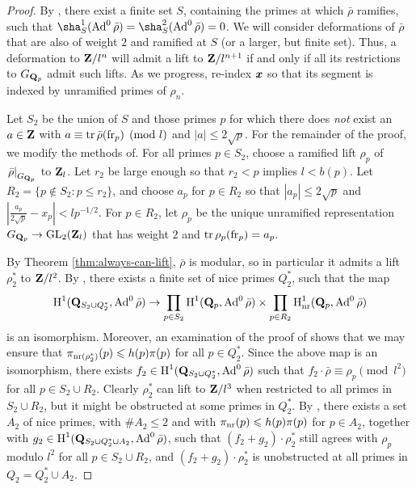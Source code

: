 \begin{proof}
By \cite[Lem.~6]{khare-larsen-ramakrishna-2005}, there exist a finite set 
$S$, containing the primes at which $\bar\rho$ ramifies, such that 
$\sha_S^1(\Ad^0\bar\rho) = \sha_S^2(\Ad^0\bar\rho) = 0$. We will 
consider deformations of $\bar\rho$ that are also of weight $2$ and ramified at 
$S$ (or a larger, but finite set). Thus, a deformation to $\mathbf{Z}/l^n$ will 
admit a lift to $\mathbf{Z}/l^{n+1}$ if and only if all its restrictions to 
$G_{\mathbf{Q}_p}$ admit such lifts. As we progress, re-index ${\boldsymbol x}$ so that its 
segment is indexed by unramified primes of $\rho_n$. 

Let $S_2$ be the union of $S$ and those primes $p$ for which there does 
\emph{not} exist an $a\in \mathbf{Z}$ with $a\equiv \operatorname{tr}\bar\rho(\mathrm{fr}_p)\pmod{l}$ and 
$|a|\leqslant 2\sqrt p$. For the remainder of the proof, we modify the methods 
of\cite{khare-larsen-ramakrishna-2005,pande-2011}. For all primes $p\in S_2$, 
choose a ramified lift $\rho_p$ of $\left.\bar\rho\right|_{G_{\mathbf{Q}_p}}$ to 
$\mathbf{Z}_l$. Let $r_2$ be large enough so that $r_2 < p$ implies $l < b(p)$. Let 
$R_2 = \{p\notin S_2 : p \leqslant r_2\}$, and choose $a_p$ for $p\in R_2$ so 
that $|a_p| \leqslant 2\sqrt p$ and 
$\left|\frac{a_p}{2\sqrt p} - x_p\right| < l p^{-1/2}$. For $p\in R_2$, let 
$\rho_p$ be the unique unramified representation $G_{\mathbf{Q}_p} \to \operatorname{GL}_2(\mathbf{Z}_l)$ 
that has weight $2$ and $\operatorname{tr}\rho_p(\mathrm{fr}_p) = a_p$. 

By Theorem \ref{thm:always-can-lift}, $\bar\rho$ is modular, so in particular 
it admits a lift $\rho_2^\ast$ to $\mathbf{Z}/l^2$. By 
\cite[Lem.~8]{khare-larsen-ramakrishna-2005}, there exists a finite set of 
nice primes $Q_2^\ast$, such that the map 
\[
	\operatorname{H}^1(\mathbf{Q}_{S_2\cup Q_2^\ast},\operatorname{Ad}^0\bar\rho) \to \prod_{p\in S_2} \operatorname{H}^1(\mathbf{Q}_p,\operatorname{Ad}^0\bar\rho) \times \prod_{p\in R_2} \operatorname{H}_{\mathrm{nr}}^1(\mathbf{Q}_p,\operatorname{Ad}^0\bar\rho) 
\]
is an isomorphism. Moreover, an examination of the proof of 
\cite[Fact 5]{khare-larsen-ramakrishna-2005} shows that we may ensure that 
$\pi_{\mathrm{nr}(\rho_2^\ast)}(p) \leqslant h(p) \pi(p)$ for all $p\in Q_2^\ast$. 
Since the above map is an isomorphism, there exists 
$f_2\in \operatorname{H}^1(\mathbf{Q}_{S_2\cup Q_2^\ast},\operatorname{Ad}^0\bar\rho)$ such that 
$f_2\cdot\bar\rho\equiv \rho_p\pmod{l^2}$ for all $p\in S_2\cup R_2$. Clearly 
$\rho_2^\ast$ can lift to $\mathbf{Z}/l^3$ when restricted to all primes in 
$S_2\cup R_2$, but it might be obstructed at some primes in $Q_2^\ast$. By 
\cite[Prop.~3.10]{pande-2011}, there exists a set $A_2$ of nice primes, with 
$\# A_2\leqslant 2$ and with $\pi_{\mathrm{nr}}(p) \leqslant h(p) \pi(p)$ for 
$p\in A_2$, together with 
$g_2\in \operatorname{H}^1(\mathbf{Q}_{S_2\cup Q_2^\ast \cup A_2},\operatorname{Ad}^0\bar\rho)$, such that 
$(f_2+g_2)\cdot\rho_2^\ast$ still agrees with $\rho_p$ modulo $l^2$ for all 
$p\in S_2\cup R_2$, and $(f_2+g_2)\cdot\rho_2^\ast$ is unobstructed at all 
primes in $Q_2 = Q_2^\ast\cup A_2$. 


\end{proof}
